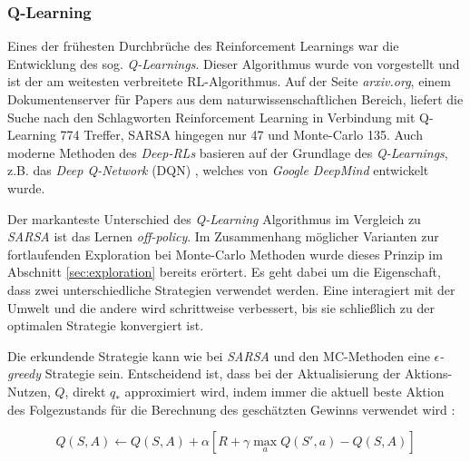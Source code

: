 \subsubsection{Q-Learning}
Eines der frühesten Durchbrüche des Reinforcement Learnings war die Entwicklung des sog. \textit{Q-Learnings}. Dieser Algorithmus wurde von \cite{watkins1989learning} vorgestellt und ist der am weitesten verbreitete RL-Algorithmus. Auf der Seite \textit{arxiv.org}, einem Dokumentenserver für Papers aus dem naturwissenschaftlichen Bereich, liefert die Suche nach den Schlagworten \glqq Reinforcement Learning\grqq{} in Verbindung mit \glqq Q-Learning\grqq{} 774 Treffer, \glqq SARSA\grqq{} hingegen nur 47 und \glqq Monte-Carlo\grqq{} 135. Auch moderne Methoden des \textit{Deep-RLs} basieren auf der Grundlage des \textit{Q-Learnings}, z.B. das \textit{Deep Q-Network} (DQN) \cite{dqn}, welches von \textit{Google DeepMind} entwickelt wurde.
\par 
Der markanteste Unterschied des \textit{Q-Learning} Algorithmus im Vergleich zu \textit{SARSA} ist das Lernen \textit{off-policy}. Im Zusammenhang möglicher Varianten zur fortlaufenden Exploration bei Monte-Carlo Methoden wurde dieses Prinzip im Abschnitt \ref{sec:exploration} bereits erörtert. Es geht dabei um die Eigenschaft, dass zwei unterschiedliche Strategien verwendet werden. Eine interagiert mit der Umwelt und die andere wird schrittweise verbessert, bis sie schließlich zu der optimalen Strategie konvergiert ist. 
\par 
Die erkundende Strategie kann wie bei \textit{SARSA} und den MC-Methoden eine $\epsilon$\textit{-greedy} Strategie sein. 
 Entscheidend ist, dass bei der Aktualisierung der Aktions-Nutzen, $Q$, direkt $q_*$ approximiert wird, indem immer die aktuell beste Aktion des Folgezustands für die Berechnung des geschätzten Gewinns verwendet wird \cite[S.131]{Sutton1998}: 

\begin{equation}
    Q(S,A) \gets Q(S,A) + \alpha [R + \gamma \max_a Q(S',a) - Q(S,A)]
\end{equation}

